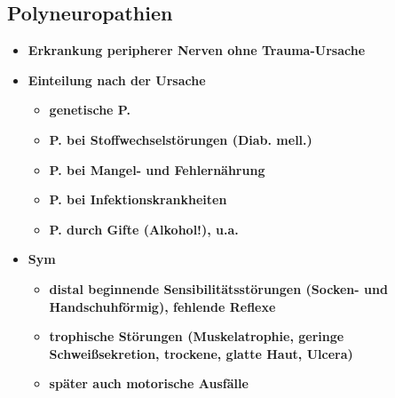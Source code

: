 	\subsection{Polyneuropathien}
		\begin{itemize}
			\item \textbf{Erkrankung peripherer Nerven ohne Trauma-Ursache}
			\item \textbf{Einteilung nach der Ursache}
				\begin{itemize}
					\item \textbf{genetische P.}
					\item \textbf{P. bei Stoffwechselstörungen (Diab. mell.)}
					\item \textbf{P. bei Mangel- und Fehlernährung}
					\item \textbf{P. bei Infektionskrankheiten}
					\item \textbf{P. durch Gifte (Alkohol!), u.a.}
				\end{itemize}				
			\item \textbf{Sym}
				\begin{itemize}
					\item \textbf{distal beginnende Sensibilitätsstörungen (Socken- und Handschuhförmig), fehlende Reflexe}
					\item \textbf{trophische Störungen (Muskelatrophie, geringe Schweißsekretion, trockene, glatte Haut, Ulcera)}
					\item \textbf{später auch motorische Ausfälle}
				\end{itemize}
		\end{itemize}